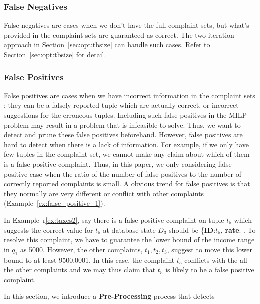   \subsubsection{False Negatives}
  False negatives are cases when we don't have the full complaint sets, but
  what's provided in the complaint sets are guaranteed as correct. The 
  two-iteration approach in Section~\ref{sec:opt:tbsize} can handle 
  such cases. Refer to Section~\ref{sec:opt:tbsize} for detail.



  \subsubsection{False Positives}
  False positives are cases when we have incorrect information in the complaint sets 
  : they can be a falsely reported tuple which are actually 
  correct, or incorrect suggestions for the erroneous tuples. 
  Including such false positives in the MILP problem may result in a problem
  that is infeasible to solve. Thus, we want to detect and prune these false positives 
  beforehand. However, false positives are hard to 
  detect when there is a lack of information. 
  For example, if we only have few tuples in the complaint
  set, we cannot make any claim about which of them is a false positive 
  complaint. Thus, in this paper, we only considering false positive
  case when the ratio of the number of false positives to the number
  of correctly reported complaints is small.
  A obvious trend for false positives is that they normally are very 
  different or conflict
  with other complaints (Example~\ref{ex:false_positive_1}).
  \begin{example} \label{ex:false_positive_1}
  In Example~r\ref{ex:taxes2}, say there is 
  a false positive complaint on tuple $t_5$ which suggests the correct value
  for $t_5$ at database state $D_3$ should be 
  \{\textbf{ID}:$t_5$, \textbf{rate}: \color{red}{30}
  \color{red}{\$1500}\color{black}{\}}. To resolve this complaint, we have
  to guarantee the lower bound of the income range in $q_1$ as 5000. 
  However, the other complaints, $t_1, t_2, t_3$, suggest to
  move this lower bound to at least 9500.0001. In this case, the complaint
  $t_5$ conflicts with the all the other complaints and we may thus
  claim that $t_5$ is likely to be a false positive complaint. 
  \end{example}
  In this section, we introduce a \textbf{Pre-Processing} process that detects 

